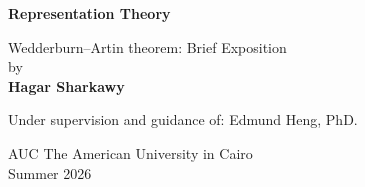 \begin{titlepage}
    \begin{center}
        \vspace*{1cm}
        
        \Huge
        \textbf{Representation Theory}
        
        \vspace{0.5cm}
        \LARGE
        Wedderburn–Artin theorem: Brief Exposition \\
        by\\
    
        \textbf{Hagar Sharkawy}
        
        \vfill
        
       Under supervision and guidance of: Edmund Heng, PhD.
    
        
        \vspace{1.8cm}

        
        \Large
        AUC The American University in Cairo\\
        Summer 2026\\
        \vspace{1.0cm}
     
    \end{center}
    
\end{titlepage}